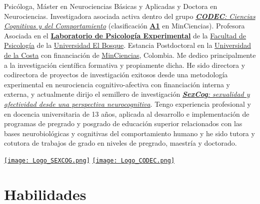 \documentclass[11pt,a4paper,]{awesome-cv}
\begin{document}
\begin{minipage}[c]{0.85\linewidth}
Psicóloga, Máster en Neurociencias Básicas y Aplicadas y Doctora en Neurociencias. Investigadora asociada activa dentro del grupo \href{https://investigaciones.unbosque.edu.co/codec}{\textit{\textbf{CODEC}: Ciencias Cognitivas y del Comportamiento}} (clasificación  \href{https://scienti.minciencias.gov.co/gruplac/jsp/visualiza/visualizagr.jsp?nro=00000000001446}{\textbf{A1}} en MinCiencias). Profesora Asociada en el \href{https://grupo-codec.netlify.app/labpsiexp/}{\textbf{Laboratorio de Psicología Experimental}} de la \href{https://www.uelbosque.edu.co/psicologia}{Facultad de Psicología} de la \href{https://www.uelbosque.edu.co/}{Universidad El Bosque}. Estancia Postdoctoral en la \href{https://www.cuc.edu.co/}{Universidad de la Costa} con financiación de \href{https://minciencias.gov.co/}{MinCiencias}, Colombia. Me dedico principalmente a la investigación científica formativa y propiamente dicha. He sido directora y codirectora de proyectos de investigación exitosos desde una metodología experimental en neurociencia cognitivo-afectiva con financiación interna y externa, y actualmente dirijo el semillero de investigación \href{https://grupo-codec.netlify.app/sexcog/}{\textit{\textbf{SexCog}: sexualidad y afectividad desde una perspectiva neurocognitiva}}. Tengo experiencia profesional y en docencia universitaria de 13 años, aplicada al desarrollo e implementación de programas de pregrado y posgrado de educación superior relacionados con las bases neurobiológicas y cognitivas del comportamiento humano y he sido tutora y cotutora de trabajos de grado en niveles de pregrado, maestría y doctorado.
\end{minipage} \begin{minipage}[c]{0.15\linewidth}
\begin{flushright} 
\hfill \href{https://grupo-codec.netlify.app/sexcog/}{\texttt{[image: Logo\_SEXCOG.png]}} \newline \href{https://investigaciones.unbosque.edu.co/codec}{\texttt{[image: Logo\_CODEC.png]}}
\end{flushright}
\end{minipage}

\hypertarget{habilidades}{%
\section{Habilidades}\label{habilidades}}
\end{document}
